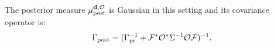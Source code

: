 




The posterior measure $\mu_{\textup{post}}^{\mathbf{d}, \mathcal{O}}$ is Gaussian in this setting and its
covariance operator is:
\begin{align}\label{eq:postcov}
  \postcov = (\prcov^{-1} + \fwd^* \obs^* \Sigma^{-1} \obs \fwd
  )^{-1}.
\end{align}


